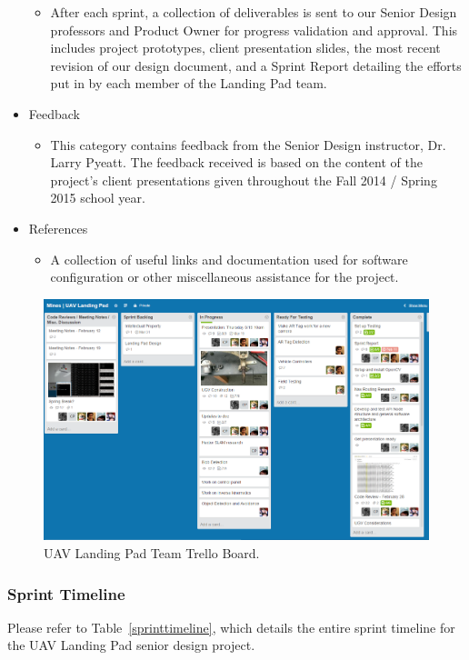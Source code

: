 \begin{itemize}
	\begin{itemize}
		\item[] After each sprint, a collection of deliverables is sent to our Senior Design professors and Product Owner for progress validation and approval. This includes project prototypes, client presentation slides, the most recent revision of our design document, and a Sprint Report detailing the efforts put in by each member of the Landing Pad team.
	\end{itemize}
	\item Feedback
	\begin{itemize}
		\item[] This category contains feedback from the Senior Design instructor, Dr. Larry Pyeatt. The feedback received is based on the content of the project's client presentations given throughout the Fall 2014 / Spring 2015 school year.
	\end{itemize}
	\item References
	\begin{itemize}
		\item[] A collection of useful links and documentation used for software configuration or other miscellaneous assistance for the project.
	\end{itemize}
\end{itemize}
\begin{figure}[tbh]
\begin{center}
\includegraphics[width=1\textwidth]{resources/img/trello}
\end{center}
\caption{ UAV Landing Pad Team Trello Board. \label{apinode}}
\end{figure}


\subsubsection{Sprint Timeline}
Please refer to Table~\ref{sprinttimeline}, which details the entire sprint timeline for the UAV Landing Pad senior design project.

